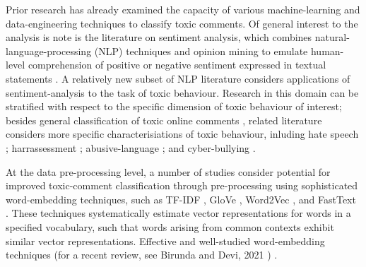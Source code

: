 
Prior research has already examined the capacity of various machine-learning and data-engineering techniques to classify toxic comments. 
Of general interest to the analysis is note is the literature on sentiment analysis, which combines natural-language-processing (NLP) techniques and opinion mining to emulate human-level comprehension of positive or negative sentiment expressed in textual statements \cite{chowdhary2020natural, cambria2014jumping}.
A relatively new subset of NLP literature considers applications of sentiment-analysis to the task of toxic behaviour. 
Research in this domain can be stratified with respect to the specific dimension of toxic behaviour of interest; besides general classification of toxic online comments \cite{georgakopoulos2018convolutional,van2018challenges,risch2020toxic}, related literature considers more specific characterisiations of toxic behaviour, inluding hate speech \cite{mullah2021advances, ayo2020machine, rizos2019augment, yang2019exploring}; harrassessment \cite{abarna2022identification, basu2021cyberpolice, marwa2018deep}; abusive-language \cite{vidgen2020directions, nobata2016abusive, bourgonje2017automatic}; and cyber-bullying \cite{kanan2020cyber, akhter2019cyber, di2016unsupervised}.

At the data pre-processing level, a number of studies consider potential for improved toxic-comment classification through pre-processing using sophisticated word-embedding techniques, such as TF-IDF \cite{luhn1957statistical, jones1972statistical}, GloVe \cite{pennington2014glove}, Word2Vec \cite{mikolov2013efficient,mikolov2013distributed}, and FastText \cite{bojanowski2017enriching, joulin2016bag, joulin2016fasttext}. These techniques systematically estimate vector representations for words in a specified vocabulary, such that words arising from common contexts exhibit similar vector representations. Effective and well-studied word-embedding techniques (for a recent review, see Birunda and Devi, 2021 \cite{selva2021review})  .